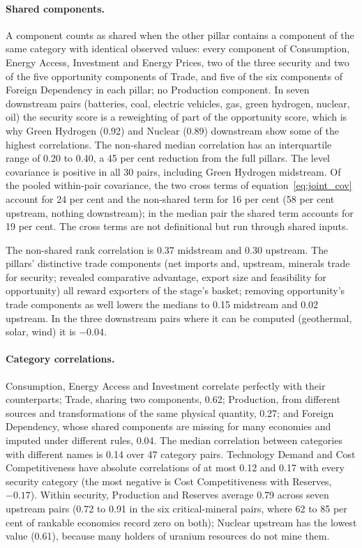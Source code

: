 \paragraph{Shared components.} A component counts as shared when the other pillar contains a
component of the same category with identical observed values: every component of Consumption,
Energy Access, Investment and Energy Prices, two of the three security and two of the five
opportunity components of Trade, and five of the six components of Foreign Dependency in each
pillar; no Production component. In seven downstream pairs (batteries, coal, electric vehicles,
gas, green hydrogen, nuclear, oil) the security score is a reweighting of part of the opportunity
score, which is why Green Hydrogen (0.92) and Nuclear (0.89) downstream show some of the highest
correlations. The non-shared median correlation has an interquartile range of 0.20 to 0.40, a 45
per cent reduction from the full pillars. The level covariance is positive in all 30 pairs,
including Green Hydrogen midstream. Of the pooled within-pair covariance, the two cross terms of
equation~\eqref{eq:joint_cov} account for 24 per cent and the non-shared term for 16 per cent
(58 per cent upstream, nothing downstream); in the median pair the shared term accounts for 19 per
cent. The cross terms are not definitional but run through shared inputs.

The non-shared rank correlation is 0.37 midstream and 0.30 upstream. The pillars' distinctive trade
components (net imports and, upstream, minerals trade for security; revealed comparative advantage,
export size and feasibility for opportunity) all reward exporters of the stage's basket; removing
opportunity's trade components as well lowers the medians to 0.15 midstream and 0.02 upstream. In
the three downstream pairs where it can be computed (geothermal, solar, wind) it is $-0.04$.

\paragraph{Category correlations.} Consumption, Energy Access and Investment correlate perfectly
with their counterparts; Trade, sharing two components, 0.62; Production, from different sources
and transformations of the same physical quantity, 0.27; and Foreign Dependency, whose shared
components are missing for many economies and imputed under different rules, 0.04. The median
correlation between categories with different names is 0.14 over 47 category pairs. Technology
Demand and Cost Competitiveness have absolute correlations of at most 0.12 and 0.17 with every
security category (the most negative is Cost Competitiveness with Reserves, $-0.17$). Within
security, Production and Reserves average 0.79 across seven upstream pairs (0.72 to 0.91 in the six
critical-mineral pairs, where 62 to 85 per cent of rankable economies record zero on both); Nuclear
upstream has the lowest value (0.61), because many holders of uranium resources do not mine them.

